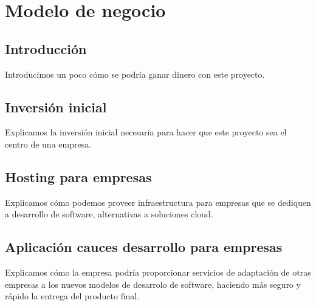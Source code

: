 \chapter {Modelo de negocio}

\section{Introducción}
	\begin{paragraph}
		Introducimos un poco cómo se podría ganar dinero con este proyecto.
	\end{paragraph}

\section{Inversión inicial}
	\begin{paragraph}
		Explicamos la inversión inicial necesaria para hacer que este proyecto sea el centro de una empresa.
	\end{paragraph}

\section{Hosting para empresas}
	\begin{paragraph}
		Explicamos cómo podemos proveer infraestructura para empresas que se dediquen a desarrollo de software, alternativas a soluciones cloud.
	\end{paragraph}

\section{Aplicación cauces desarrollo para empresas}
\begin{paragraph}
	Explicamos cómo la empresa podría proporcionar servicios de adaptación de otras empresas a los nuevos modelos de desarrolo de software, haciendo más seguro y rápido la entrega del producto final.
\end{paragraph}